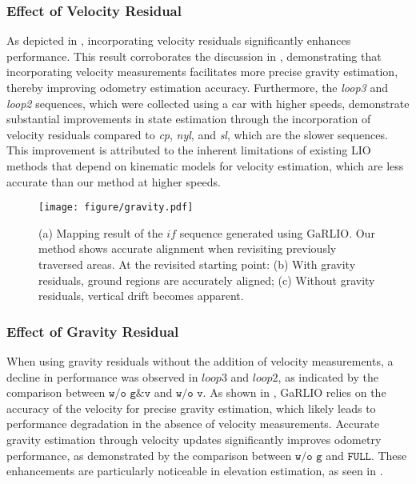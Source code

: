 \subsubsection{Effect of Velocity Residual}
As depicted in , incorporating velocity residuals significantly enhances performance. This result corroborates the discussion in , demonstrating that incorporating velocity measurements facilitates more precise gravity estimation, thereby improving odometry estimation accuracy. 
Furthermore, the \textit{loop3} and \textit{loop2} sequences,
which were collected using a car with higher speeds,
demonstrate substantial improvements in state estimation through the incorporation of velocity residuals compared to \textit{cp}, \textit{nyl}, and \textit{sl}, which are the slower sequences. This improvement is attributed to the inherent limitations of existing LIO methods that depend on kinematic models for velocity estimation, which are less accurate than our method at higher speeds.

\begin{figure}[]
    \centering
    \texttt{[image: figure/gravity.pdf]}
    \caption{(a) Mapping result of the $\textit{if}$ sequence generated using GaRLIO. Our method shows accurate alignment when revisiting previously traversed areas. At the revisited starting point: (b) With gravity residuals, ground regions are accurately aligned; (c) Without gravity residuals, vertical drift becomes apparent.}
    \label{fig:gravity}
    \vspace{-2mm}
\end{figure}



\subsubsection{Effect of Gravity Residual}
When using gravity residuals without the addition of velocity measurements, a decline in performance was observed in $\textit{loop3}$ and $\textit{loop2}$, as indicated by the comparison between $\texttt{w/o g\&v}$ and $\texttt{w/o v}$. 
As shown in , GaRLIO relies on the accuracy of the velocity for precise gravity estimation, which likely leads to performance degradation in the absence of velocity measurements. 
Accurate gravity estimation through velocity updates significantly improves odometry performance, as demonstrated by the comparison between $\texttt{w/o g}$ and $\texttt{FULL}$. These enhancements are particularly noticeable in elevation estimation, as seen in .

